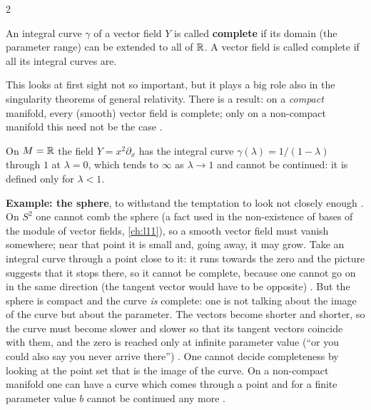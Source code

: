 \begin{paracol}{2}
\begin{definition}\label{def:rc-complete}
An integral curve $\gamma$ of a vector field $Y$ is called \textbf{complete} if its domain (the parameter range) can be extended to all of $\mathbb{R}$. A vector field is called complete if all its integral curves are.    
\end{definition}
This looks at first sight not so important, but it plays a big role also in the singularity theorems of general relativity. There is a result: on a \emph{compact} manifold, every (smooth) vector field is complete; only on a non-compact manifold this need not be the case  .
\begin{coursenote}
On $M=\mathbb{R}$ the field $Y=x^2\partial_x$ has the integral curve $\gamma(\lambda)=1/(1-\lambda)$ through $1$ at $\lambda=0$, which tends to $\infty$ as $\lambda\to1$ and cannot be continued: it is defined only for $\lambda<1$. 
\end{coursenote}
\textbf{Example: the sphere}, to withstand the temptation to look not closely enough . On $S^2$ one cannot comb the sphere (a fact used in the non-existence of bases of the module of vector fields, \cref{ch:l11}), so a smooth vector field must vanish somewhere; near that point it is small and, going away, it may grow. Take an integral curve through a point close to it: it runs towards the zero and the picture suggests that it stops there, so it cannot be complete, because one cannot go on in the same direction (the tangent vector would have to be opposite)    . But the sphere is compact and the curve \emph{is} complete: one is not talking about the image of the curve but about the parameter. The vectors become shorter and shorter, so the curve must become slower and slower so that its tangent vectors coincide with them, and the zero is reached only at infinite parameter value (``or you could also say you never arrive there'')  . One cannot decide completeness by looking at the point set that is the image of the curve. On a non-compact manifold one can have a curve which comes through a point and for a finite parameter value $b$ cannot be continued any more  .


\end{paracol}
